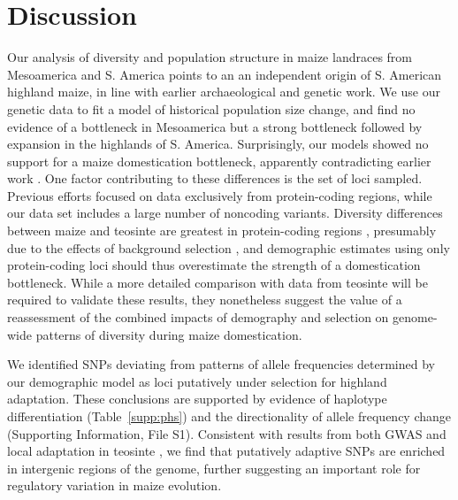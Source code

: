  \section*{Discussion}

Our analysis of diversity and population structure in maize landraces from Mesoamerica and S. America points to an  an independent origin of S. American highland maize, in line with earlier archaeological \cite[]{Piperno_2006_69,Perry_2006_16511492,Grobman_2012_22307642} and genetic \citep{vanHeerwaarden_2011_21189301} work. 
We use our genetic data to fit a model of historical population size change, and find no evidence of a bottleneck in Mesoamerica but a strong bottleneck followed by expansion in the highlands of S. America. 
Surprisingly, our models showed no support for a maize domestication bottleneck, apparently contradicting earlier work \cite[]{Eyre-Walker_1998_9539756,Tenaillon_2004_15014173,Wright_2005_15919994}. 
One factor contributing to these differences is the set of loci sampled. 
Previous efforts focused on data exclusively from protein-coding regions, while our data set includes a large number of noncoding variants.
Diversity differences between maize and teosinte are greatest in protein-coding regions \citep{Hufford_2012_22660546}, presumably due to the effects of background selection \citep{Charlesworth_1993_8375663}, and demographic estimates using only protein-coding loci should thus overestimate the strength of a domestication bottleneck.
While a more detailed comparison with data from teosinte will be required to validate these results, they nonetheless suggest the value of a reassessment of the combined impacts of demography and selection on genome-wide patterns of diversity during maize domestication.

We identified SNPs deviating from patterns of allele frequencies determined by our demographic model as loci putatively under selection for highland adaptation.
These conclusions are supported by evidence of haplotype differentiation (Table~\ref{supp:phs}) and the directionality of allele frequency change (Supporting Information, File S1).
Consistent with results from both GWAS \citep{Wallace_2014_25474422} and local adaptation in teosinte \citep{Pyhajarvi2013}, we find that putatively adaptive SNPs are enriched in intergenic regions of the genome, further suggesting an important role for regulatory variation in maize evolution. 

